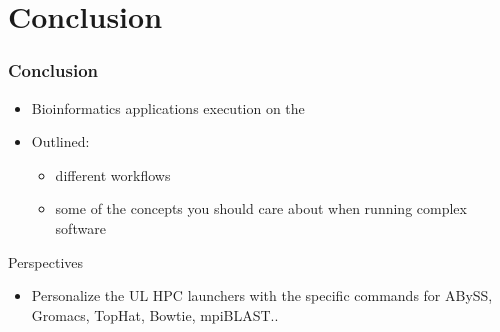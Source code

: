 \documentclass{beamer}
\begin{document}

\section{Conclusion}

\begin{frame}
  \frametitle{Conclusion}
  
  \begin{itemize}
    \item Bioinformatics applications execution on the \ULHPC
    \item Outlined:
    \begin{itemize}
      \item different workflows
      \item some of the concepts you should care about when running complex software
    \end{itemize}
  \end{itemize}

    \begin{block}{Perspectives}
        \begin{itemize}
          \item Personalize the UL HPC launchers with the specific commands for ABySS, Gromacs, TopHat, Bowtie, mpiBLAST..
        \end{itemize}
    \end{block}

\end{frame}
\end{document}
